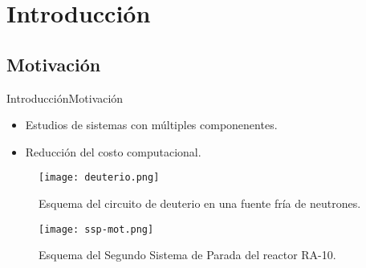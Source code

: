 \section{Introducción}

\subsection{Motivación}

\begin{frame}{Introducción}{Motivación}
  \begin{itemize}
  \item Estudios de sistemas con múltiples componenentes.
  \item Reducción del costo computacional.
  \end{itemize}
  
  

  \begin{figure}[ht]
    \begin{minipage}{0.4\linewidth}
      \centering
      \texttt{[image: deuterio.png]}
      \caption[]{Esquema del circuito de deuterio en una fuente fría de neutrones.}
      \label{fuente-fria-mot}	
    \end{minipage}
    \begin{minipage}{0.58\linewidth}
      \centering
      \texttt{[image: ssp-mot.png]}
      \caption[]{Esquema del Segundo Sistema de Parada del reactor RA-10.}
      \label{ssp-mot}	
    \end{minipage}
    \label{aasdasd}
  \end{figure}
  
\end{frame}


